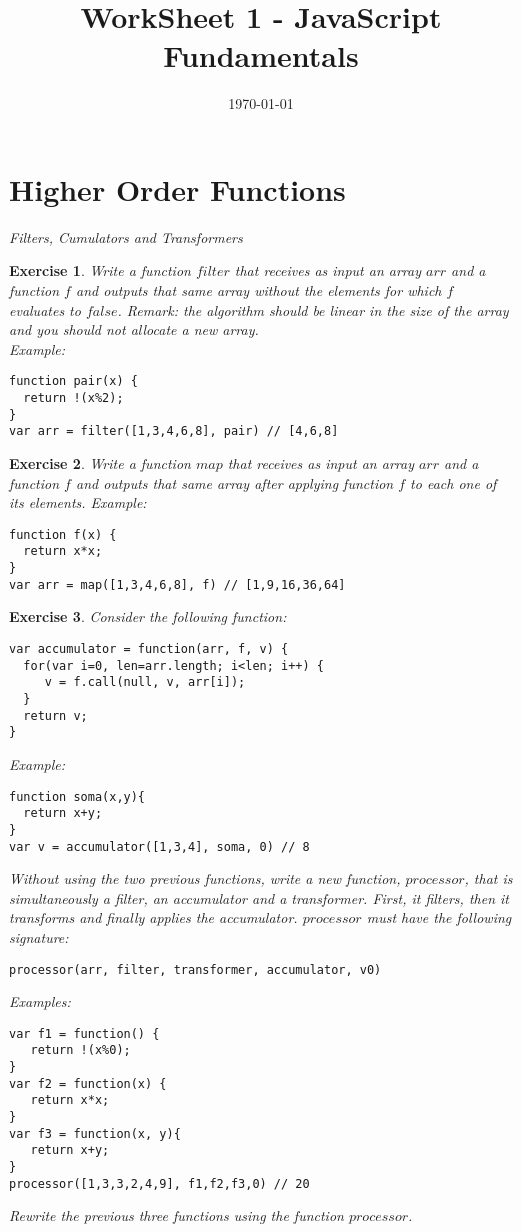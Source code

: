 \documentclass{article}
\title{WorkSheet 1 - JavaScript Fundamentals}
\date{\today}
\newtheorem{ex}{Exercise}[section]
\begin{document}
\maketitle 

\section{Higher Order Functions}

\textit{Filters, Cumulators and Transformers}

\begin{ex}
\label{filter:ex}
Write a function $filter$ that receives as input an array $arr$ and a function $f$ and outputs 
that same array without the elements for which $f$ evaluates to $false$. Remark: the algorithm 
should be linear in the size of the array and you should not allocate a new array. \\
Example: 
\begin{verbatim}
function pair(x) { 
  return !(x%2); 
}
var arr = filter([1,3,4,6,8], pair) // [4,6,8] 
\end{verbatim}    
\end{ex}

\begin{ex}
Write a function $map$ that receives as input an array $arr$ and a function $f$ and outputs 
that same array after applying function $f$ to each one of its elements. 
Example:     
\begin{verbatim}
function f(x) { 
  return x*x; 
}
var arr = map([1,3,4,6,8], f) // [1,9,16,36,64] 
\end{verbatim} 
\end{ex}

\begin{ex}
Consider the following function: 
\begin{verbatim}
var accumulator = function(arr, f, v) { 
  for(var i=0, len=arr.length; i<len; i++) { 
     v = f.call(null, v, arr[i]); 
  }
  return v; 
} 
\end{verbatim} 
Example: 
\begin{verbatim}
function soma(x,y){
  return x+y; 
}
var v = accumulator([1,3,4], soma, 0) // 8 
\end{verbatim} 
Without using the two previous functions, write a new function, $processor$, that is 
simultaneously a filter, an accumulator and a transformer. First, it filters, then it transforms and finally applies the accumulator.
$processor$ must have the following signature: 
\begin{verbatim}
processor(arr, filter, transformer, accumulator, v0)
\end{verbatim} 
Examples: 
\begin{verbatim}
var f1 = function() { 
   return !(x%0); 
}
var f2 = function(x) { 
   return x*x; 
} 
var f3 = function(x, y){
   return x+y; 
}
processor([1,3,3,2,4,9], f1,f2,f3,0) // 20
\end{verbatim} 
Rewrite the previous three functions using the function $processor$.   
\end{ex}
\end{document}
